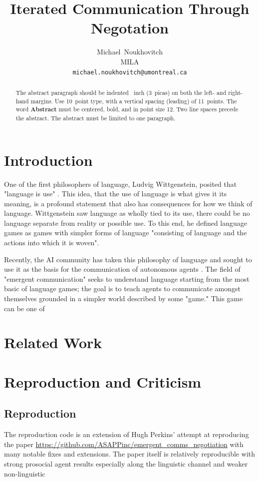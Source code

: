 \documentclass{article}
\title{Iterated Communication Through Negotation}
\author{
  Michael~Noukhovitch\\
  MILA\\
  \texttt{michael.noukhovitch@umontreal.ca} \\
}
\begin{document}
\maketitle

\begin{abstract}
  The abstract paragraph should be indented ~inch
  (3~picas) on both the left- and right-hand margins. Use 10~point
  type, with a vertical spacing (leading) of 11~points.  The word
  \textbf{Abstract} must be centered, bold, and in point size 12. Two
  line spaces precede the abstract. The abstract must be limited to
  one paragraph.
\end{abstract}

\section{Introduction}

One of the first philosophers of language, Ludvig Wittgenstein, posited that
"language is use" \cite{wittgenstein2009philosophical}. This idea, that the use
of language is what gives it its meaning, is a profound statement that also has
consequences for how we think of language. Wittgenstein saw language as wholly
tied to its use, there could be no language separate from reality or possible
use. To this end, he defined language games as games with simpler forms of
language "consisting of language and the actions into which it is woven".

Recently, the AI community has taken this philosophy of language and sought to
use it as the basis for the communication of autonomous agents
\cite{wagner2003progress}. The field of "emergent communication" seeks to
understand language starting from the most basic of language games; the goal is
to teach agents to communicate amongst themselves grounded in a simpler world
described by some "game." This game can be one of

\section{Related Work}%
\label{sec:related_work}

\section{Reproduction and Criticism}%
\label{sec:reproduction}

\subsection{Reproduction}%
\label{sub:reproduction}
The reproduction code is an extension of Hugh Perkins' attempt at reproducing
the paper \url{https://github.com/ASAPPinc/emergent_comms_negotiation} with
many notable fixes and extensions. The paper itself is relatively reproducible
with strong prosocial agent results especially along the linguistic channel
and weaker non-linguistic
\end{document}
